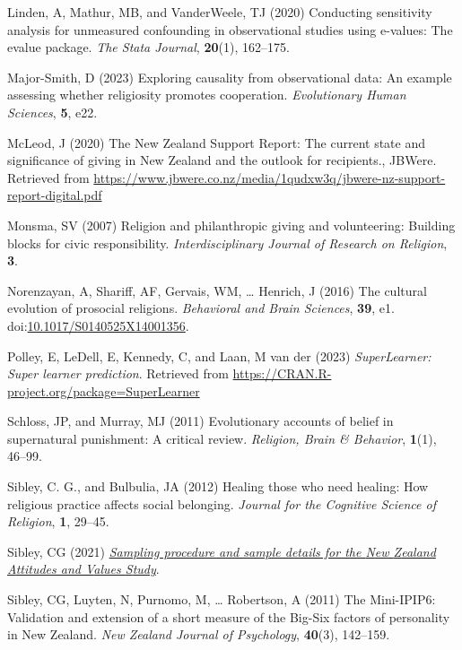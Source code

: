 \documentclass[
  single column]{article}
\newlength{\cslhangindent}
\newenvironment{CSLReferences}[2] %
 {\begin{list}{}{%
  \setlength{\itemindent}{0pt}
  \setlength{\leftmargin}{0pt}
  \setlength{\parsep}{0pt}
  \ifodd #1
   \setlength{\leftmargin}{\cslhangindent}
   \setlength{\itemindent}{-1\cslhangindent}
  \fi
  \setlength{\itemsep}{#2\baselineskip}}}
 {\end{list}}
\begin{document}
\begin{CSLReferences}{1}{0}
Linden, A, Mathur, MB, and VanderWeele, TJ (2020) Conducting sensitivity
analysis for unmeasured confounding in observational studies using
e-values: The evalue package. \emph{The Stata Journal}, \textbf{20}(1),
162--175.

Major-Smith, D (2023) Exploring causality from observational data: An
example assessing whether religiosity promotes cooperation.
\emph{Evolutionary Human Sciences}, \textbf{5}, e22.

McLeod, J (2020) The {N}ew {Z}ealand {S}upport {R}eport: The current
state and significance of giving in {N}ew {Z}ealand and the outlook for
recipients., JBWere. Retrieved from
\url{https://www.jbwere.co.nz/media/1qudxw3q/jbwere-nz-support-report-digital.pdf}

Monsma, SV (2007) Religion and philanthropic giving and volunteering:
Building blocks for civic responsibility. \emph{Interdisciplinary
Journal of Research on Religion}, \textbf{3}.

Norenzayan, A, Shariff, AF, Gervais, WM, \ldots{} Henrich, J (2016) The
cultural evolution of prosocial religions. \emph{Behavioral and Brain
Sciences}, \textbf{39}, e1.
doi:\href{https://doi.org/10.1017/S0140525X14001356}{10.1017/S0140525X14001356}.

Polley, E, LeDell, E, Kennedy, C, and Laan, M van der (2023)
\emph{SuperLearner: Super learner prediction}. Retrieved from
\url{https://CRAN.R-project.org/package=SuperLearner}

Schloss, JP, and Murray, MJ (2011) Evolutionary accounts of belief in
supernatural punishment: A critical review. \emph{Religion, Brain \&
Behavior}, \textbf{1}(1), 46--99.

Sibley, C. G., and Bulbulia, JA (2012) Healing those who need healing:
How religious practice affects social belonging. \emph{Journal for the
Cognitive Science of Religion}, \textbf{1}, 29--45.

Sibley, CG (2021)
\emph{\href{https://doi.org/10.31234/osf.io/wgqvy}{Sampling procedure
and sample details for the {N}ew {Z}ealand {A}ttitudes and {V}alues
{S}tudy}}.

Sibley, CG, Luyten, N, Purnomo, M, \ldots{} Robertson, A (2011) The
Mini-IPIP6: Validation and extension of a short measure of the Big-Six
factors of personality in {N}ew {Z}ealand. \emph{New Zealand Journal of
Psychology}, \textbf{40}(3), 142--159.


\end{CSLReferences}
\end{document}
